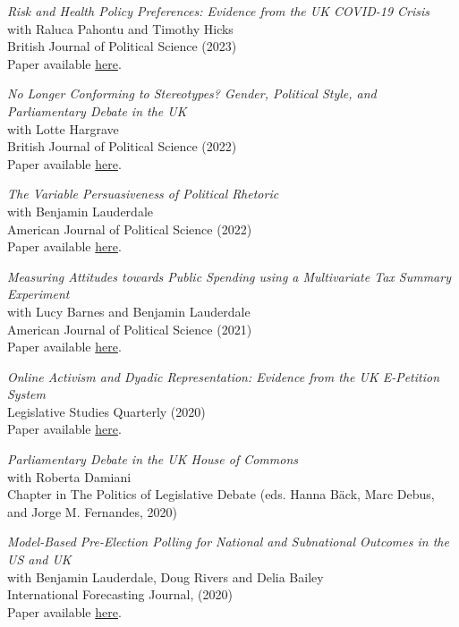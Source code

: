 \documentclass[centered]{res}
\begin{document}
\begin{resume}
{\sl Risk and Health Policy Preferences: Evidence from the UK COVID-19 Crisis} \\
with Raluca Pahontu and Timothy Hicks \\
British Journal of Political Science (2023) \\
Paper available \href{https://doi.org/10.1017/S0007123422000539} {here}.

{\sl No Longer Conforming to Stereotypes? Gender, Political Style, and Parliamentary Debate in the UK} \\
with Lotte Hargrave\\
British Journal of Political Science (2022)\\
Paper available \href{https://doi.org/10.1017/S0007123421000648} {here}.

{\sl The Variable Persuasiveness of Political Rhetoric} \\
with Benjamin Lauderdale\\
American Journal of Political Science (2022)\\
Paper available \href{https://doi.org/10.1111/ajps.12703} {here}.

{\sl Measuring Attitudes towards Public Spending using a Multivariate Tax Summary Experiment} \\
with Lucy Barnes and Benjamin Lauderdale\\
American Journal of Political Science (2021)\\
Paper available \href{https://www.jackblumenau.com/papers/spending_experiment.pdf} {here}.

{\sl Online Activism and Dyadic Representation: Evidence from the UK E-Petition System} \\
Legislative Studies Quarterly (2020) \\
Paper available \href{https://www.jackblumenau.com/papers/petitions.pdf} {here}.

{\sl Parliamentary Debate in the UK House of Commons} \\
with Roberta Damiani \\
Chapter in The Politics of Legislative Debate (eds. Hanna B{\"a}ck, Marc Debus, and Jorge M. Fernandes, 2020) 

{\sl Model-Based Pre-Election Polling for National and Subnational Outcomes in the US and UK} \\
with Benjamin Lauderdale, Doug Rivers and Delia Bailey\\ 
International Forecasting Journal, (2020)\\
Paper available \href{https://www.sciencedirect.com/science/article/abs/pii/S016920701930189X} {here}.


\end{resume}
\end{document}
